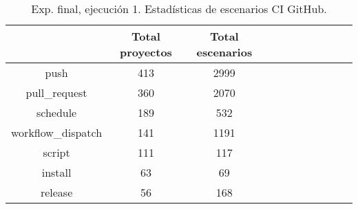 \begin{table}[h]
  \centering
  \caption{Exp. final, ejecución 1. Estadísticas de escenarios CI GitHub.}
  \label{tab:tabla_f1_5}

\begin{footnotesize}
\renewcommand{\arraystretch}{1.5} %
\begin{tabular}{ccccccccccc}
  \hline
  {} &  Total proyectos &  Total escenarios \\
  \hline
  push                        &                 413 &          2999 \\
  pull\_request                &                 360 &          2070 \\
  schedule                    &                 189 &           532 \\
  workflow\_dispatch           &                 141 &          1191 \\
  script                      &                 111 &           117 \\
  install                     &                  63 &            69 \\
  release                     &                  56 &           168 \\

\end{tabular}
\end{footnotesize}
\end{table}
